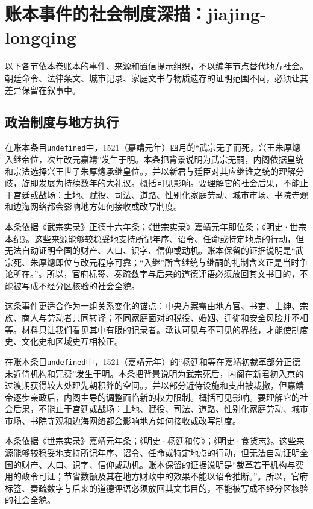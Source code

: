 \section{账本事件的社会制度深描：jiajing-longqing}

\label{sec:ledger-depth-jiajing-longqing}

以下各节依本卷账本的事件、来源和置信提示组织，不以编年节点替代地方社会。朝廷命令、法律条文、城市记录、家庭文书与物质遗存的证明范围不同，必须让其差异保留在叙事中。

\subsection{政治制度与地方执行}

在账本条目\texttt{undefined}中，1521（嘉靖元年）四月的“武宗无子而死，兴王朱厚熜入继帝位，次年改元嘉靖”发生于明。本条把背景说明为武宗无嗣，内阁依据皇统和宗法选择兴王世子朱厚熜承继皇位。，并以新君与廷臣对其应继谁之统的理解分歧，旋即发展为持续数年的大礼议。概括可见影响。要理解它的社会后果，不能止于宫廷或战场：土地、赋役、司法、道路、性别化家庭劳动、城市市场、书院寺观和边海网络都会影响地方如何接收或改写制度。

本条依据《武宗实录》正德十六年条；《世宗实录》嘉靖元年即位条；《明史·世宗本纪》。这些来源能够较稳妥地支持所记年序、诏令、任命或特定地点的行动，但无法自动证明全国的财产、人口、识字、信仰或动机。账本保留的证据说明是“武宗死、朱厚熜即位与改元程序可靠；“入继”所含继统与继嗣的礼制含义正是当时争论所在。”。所以，官府标签、奏疏数字与后来的道德评语必须放回其文书目的，不能被写成不经分区核验的社会全貌。

这条事件更适合作为一组关系变化的锚点：中央方案需由地方官、书吏、士绅、宗族、商人与劳动者共同转译；不同家庭面对的税役、婚姻、迁徙和安全风险并不相等。材料只让我们看见其中有限的记录者。承认可见与不可见的界线，才能使制度史、文化史和区域史互相校正。

在账本条目\texttt{undefined}中，1521（嘉靖元年）的“杨廷和等在嘉靖初裁革部分正德末近侍机构和冗费”发生于明。本条把背景说明为武宗死后，内阁在新君初入京的过渡期获得较大处理先朝积弊的空间。，并以部分近侍设施和支出被裁撤，但嘉靖帝逐步亲政后，内阁主导的调整面临新的权力限制。概括可见影响。要理解它的社会后果，不能止于宫廷或战场：土地、赋役、司法、道路、性别化家庭劳动、城市市场、书院寺观和边海网络都会影响地方如何接收或改写制度。

本条依据《世宗实录》嘉靖元年条；《明史·杨廷和传》；《明史·食货志》。这些来源能够较稳妥地支持所记年序、诏令、任命或特定地点的行动，但无法自动证明全国的财产、人口、识字、信仰或动机。账本保留的证据说明是“裁革若干机构与费用的政令可证；节省数额及其在地方财政中的效果不能以诏令推断。”。所以，官府标签、奏疏数字与后来的道德评语必须放回其文书目的，不能被写成不经分区核验的社会全貌。

